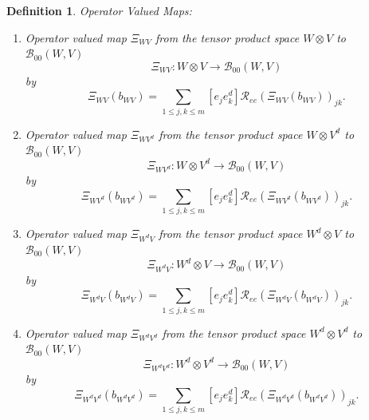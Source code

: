 \documentclass[aps,preprint]{revtex4}%
\newtheorem{definition}[theorem]{Definition}
\begin{document}
\begin{definition}
Operator Valued Maps:

\begin{enumerate}
\item Operator valued map $\Xi_{WV}$ from the tensor product space $W\otimes
V$ to $\mathcal{B}_{00}\left(  W,V\right)  $
\begin{equation}
\Xi_{WV}:W\otimes V\rightarrow\mathcal{B}_{00}\left(  W,V\right)
\end{equation}
by%
\begin{equation}
\Xi_{WV}\left(  b_{WV}\right)  =\sum_{1\leq j,k\leq m}\left[  e_{j}e_{k}%
^{d}\right]  \mathcal{R}_{ee}\left(  \Xi_{WV}\left(  b_{WV}\right)  \right)
_{jk}.
\end{equation}


\item Operator valued map $\Xi_{WV^{d}}$ from the tensor product space
$W\otimes V^{d}$ to $\mathcal{B}_{00}\left(  W,V\right)  $%
\begin{equation}
\Xi_{WV^{d}}:W\otimes V^{d}\rightarrow\mathcal{B}_{00}\left(  W,V\right)
\end{equation}
by%
\begin{equation}
\Xi_{WV^{d}}\left(  b_{WV^{d}}\right)  =\sum_{1\leq j,k\leq m}\left[
e_{j}e_{k}^{d}\right]  \mathcal{R}_{ee}\left(  \Xi_{WV^{d}}\left(  b_{WV^{d}%
}\right)  \right)  _{jk}.
\end{equation}


\item Operator valued map $\Xi_{W^{d}V}$ from the tensor product space
$W^{d}\otimes V$ to $\mathcal{B}_{00}\left(  W,V\right)  $%
\begin{equation}
\Xi_{W^{d}V}:W^{d}\otimes V\rightarrow\mathcal{B}_{00}\left(  W,V\right)
\end{equation}
by%
\begin{equation}
\Xi_{W^{d}V}\left(  b_{W^{d}V}\right)  =\sum_{1\leq j,k\leq m}\left[
e_{j}e_{k}^{d}\right]  \mathcal{R}_{ee}\left(  \Xi_{W^{d}V}\left(  b_{W^{d}%
V}\right)  \right)  _{jk}.
\end{equation}


\item Operator valued map $\Xi_{W^{d}V^{d}}$ from the tensor product space
$W^{d}\otimes V^{d}$ to $\mathcal{B}_{00}\left(  W,V\right)  $%
\begin{equation}
\Xi_{W^{d}V^{d}}:W^{d}\otimes V^{d}\rightarrow\mathcal{B}_{00}\left(
W,V\right)
\end{equation}
by%
\begin{equation}
\Xi_{W^{d}V^{d}}\left(  b_{W^{d}V^{d}}\right)  =\sum_{1\leq j,k\leq m}\left[
e_{j}e_{k}^{d}\right]  \mathcal{R}_{ee}\left(  \Xi_{W^{d}V^{d}}\left(
b_{W^{d}V^{d}}\right)  \right)  _{jk}.
\end{equation}



\end{enumerate}
\end{definition}
\end{document}
